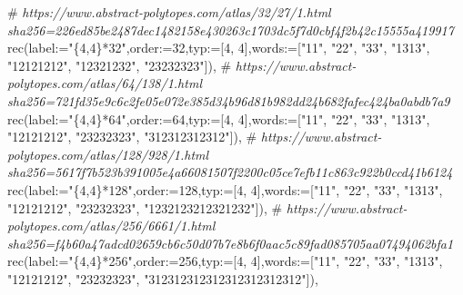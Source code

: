 \documentclass[
  10pt,
  letterpaper,
]{article}
\newenvironment{Shaded}{}{}
\newcommand{\CommentTok}[1]{\textcolor[rgb]{0.38,0.63,0.69}{\textit{#1}}}
\newcommand{\ExtensionTok}[1]{#1}
\newcommand{\FloatTok}[1]{\textcolor[rgb]{0.25,0.63,0.44}{#1}}
\newcommand{\NormalTok}[1]{#1}
\newcommand{\OperatorTok}[1]{\textcolor[rgb]{0.40,0.40,0.40}{#1}}
\newcommand{\StringTok}[1]{\textcolor[rgb]{0.25,0.44,0.63}{#1}}
\newcommand{\VariableTok}[1]{\textcolor[rgb]{0.10,0.09,0.49}{#1}}
\begin{document}
\begin{Shaded}
\begin{Highlighting}[]
\NormalTok{\#}\CommentTok{ https://www.abstract{-}polytopes.com/atlas/32/27/1.html sha256=226ed85be2487dec1482158e430263c1703dc5f7d0cbf4f2b42c15555a419917}
\ExtensionTok{rec}\NormalTok{(}\VariableTok{label}\OperatorTok{:=}\StringTok{"\{4,4\}*32"}\OperatorTok{,}\VariableTok{order}\OperatorTok{:=}\FloatTok{32}\OperatorTok{,}\VariableTok{typ}\OperatorTok{:=}\NormalTok{[}\FloatTok{4}\OperatorTok{,} \FloatTok{4}\NormalTok{]}\OperatorTok{,}\VariableTok{words}\OperatorTok{:=}\NormalTok{[}\StringTok{"11"}\OperatorTok{,} \StringTok{"22"}\OperatorTok{,} \StringTok{"33"}\OperatorTok{,} \StringTok{"1313"}\OperatorTok{,} \StringTok{"12121212"}\OperatorTok{,} \StringTok{"12321232"}\OperatorTok{,} \StringTok{"23232323"}\NormalTok{])}\OperatorTok{,}
\NormalTok{\#}\CommentTok{ https://www.abstract{-}polytopes.com/atlas/64/138/1.html sha256=721fd35e9c6c2fe05e072e385d34b96d81b982dd24b682fafec424ba0abdb7a9}
\ExtensionTok{rec}\NormalTok{(}\VariableTok{label}\OperatorTok{:=}\StringTok{"\{4,4\}*64"}\OperatorTok{,}\VariableTok{order}\OperatorTok{:=}\FloatTok{64}\OperatorTok{,}\VariableTok{typ}\OperatorTok{:=}\NormalTok{[}\FloatTok{4}\OperatorTok{,} \FloatTok{4}\NormalTok{]}\OperatorTok{,}\VariableTok{words}\OperatorTok{:=}\NormalTok{[}\StringTok{"11"}\OperatorTok{,} \StringTok{"22"}\OperatorTok{,} \StringTok{"33"}\OperatorTok{,} \StringTok{"1313"}\OperatorTok{,} \StringTok{"12121212"}\OperatorTok{,} \StringTok{"23232323"}\OperatorTok{,} \StringTok{"312312312312"}\NormalTok{])}\OperatorTok{,}
\NormalTok{\#}\CommentTok{ https://www.abstract{-}polytopes.com/atlas/128/928/1.html sha256=5617f7b523b391005e4a66081507f2200c05ce7efb11c863c922b0ccd41b6124}
\ExtensionTok{rec}\NormalTok{(}\VariableTok{label}\OperatorTok{:=}\StringTok{"\{4,4\}*128"}\OperatorTok{,}\VariableTok{order}\OperatorTok{:=}\FloatTok{128}\OperatorTok{,}\VariableTok{typ}\OperatorTok{:=}\NormalTok{[}\FloatTok{4}\OperatorTok{,} \FloatTok{4}\NormalTok{]}\OperatorTok{,}\VariableTok{words}\OperatorTok{:=}\NormalTok{[}\StringTok{"11"}\OperatorTok{,} \StringTok{"22"}\OperatorTok{,} \StringTok{"33"}\OperatorTok{,} \StringTok{"1313"}\OperatorTok{,} \StringTok{"12121212"}\OperatorTok{,} \StringTok{"23232323"}\OperatorTok{,} \StringTok{"1232123212321232"}\NormalTok{])}\OperatorTok{,}
\NormalTok{\#}\CommentTok{ https://www.abstract{-}polytopes.com/atlas/256/6661/1.html sha256=f4b60a47adcd02659cb6c50d07b7e8b6f0aac5c89fad085705aa07494062bfa1}
\ExtensionTok{rec}\NormalTok{(}\VariableTok{label}\OperatorTok{:=}\StringTok{"\{4,4\}*256"}\OperatorTok{,}\VariableTok{order}\OperatorTok{:=}\FloatTok{256}\OperatorTok{,}\VariableTok{typ}\OperatorTok{:=}\NormalTok{[}\FloatTok{4}\OperatorTok{,} \FloatTok{4}\NormalTok{]}\OperatorTok{,}\VariableTok{words}\OperatorTok{:=}\NormalTok{[}\StringTok{"11"}\OperatorTok{,} \StringTok{"22"}\OperatorTok{,} \StringTok{"33"}\OperatorTok{,} \StringTok{"1313"}\OperatorTok{,} \StringTok{"12121212"}\OperatorTok{,} \StringTok{"23232323"}\OperatorTok{,} \StringTok{"312312312312312312312312"}\NormalTok{])}\OperatorTok{,}

\end{Highlighting}
\end{Shaded}
\end{document}
